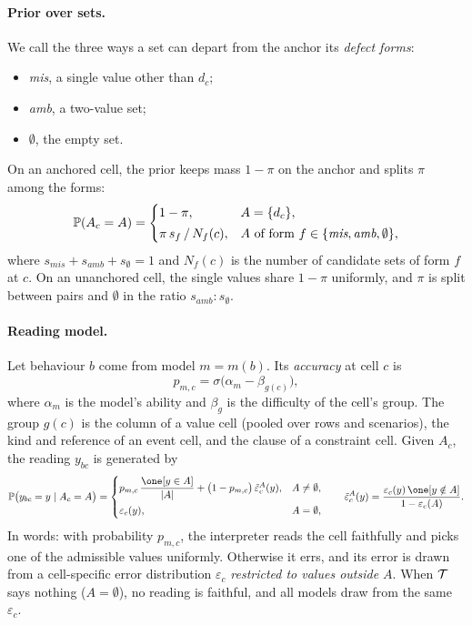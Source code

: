 \paragraph{Prior over sets.} We call the three ways a set can depart from the anchor its \emph{defect forms}:
\begin{itemize}[leftmargin=*]
\item \emph{mis}, a single value other than $d_c$;
\item \emph{amb}, a two-value set;
\item $\emptyset$, the empty set.
\end{itemize}
On an anchored cell, the prior keeps mass $1-\pi$ on the anchor and splits $\pi$ among the forms:
\begin{equation}
\label{eq:setprior}
\mathbb{P}(A_c=A)=
\begin{cases}
1-\pi, & A=\{d_c\},\\[2pt]
\pi\,s_f\,/\,N_f(c), & A \text{ of form } f\in\{\textit{mis},\textit{amb},\emptyset\},
\end{cases}
\end{equation}
where $s_{\textit{mis}}+s_{\textit{amb}}+s_\emptyset=1$ and $N_f(c)$ is the number of candidate sets of form $f$ at $c$. On an unanchored cell, the single values share $1-\pi$ uniformly, and $\pi$ is split between pairs and $\emptyset$ in the ratio $s_{\textit{amb}}:s_\emptyset$.

\paragraph{Reading model.} Let behaviour $b$ come from model $m=m(b)$. Its \emph{accuracy} at cell $c$ is
\begin{equation}
\label{eq:accuracy}
p_{m,c}=\sigma\bigl(\alpha_m-\beta_{g(c)}\bigr),
\end{equation}
where $\alpha_m$ is the model's ability and $\beta_g$ is the difficulty of the cell's group. The group $g(c)$ is the column of a value cell (pooled over rows and scenarios), the kind and reference of an event cell, and the clause of a constraint cell. Given $A_c$, the reading $y_{bc}$ is generated by
\begin{equation}
\label{eq:reading}
\Prob\bigl(y_{bc}=y\mid A_c=A\bigr)=
\begin{cases}
p_{m,c}\,\dfrac{\one[y\in A]}{|A|}+\bigl(1-p_{m,c}\bigr)\,\tilde\varepsilon_c^{A}(y), & A\neq\emptyset,\\[8pt]
\varepsilon_c(y), & A=\emptyset,
\end{cases}
\qquad
\tilde\varepsilon_c^{A}(y)=\frac{\varepsilon_c(y)\,\one[y\notin A]}{1-\varepsilon_c(A)} .
\end{equation}
In words: with probability $p_{m,c}$, the interpreter reads the cell faithfully and picks one of the admissible values uniformly. Otherwise it errs, and its error is drawn from a cell-specific error distribution $\varepsilon_c$ \emph{restricted to values outside $A$}. When $\mathcal{T}$ says nothing ($A=\emptyset$), no reading is faithful, and all models draw from the same $\varepsilon_c$.

